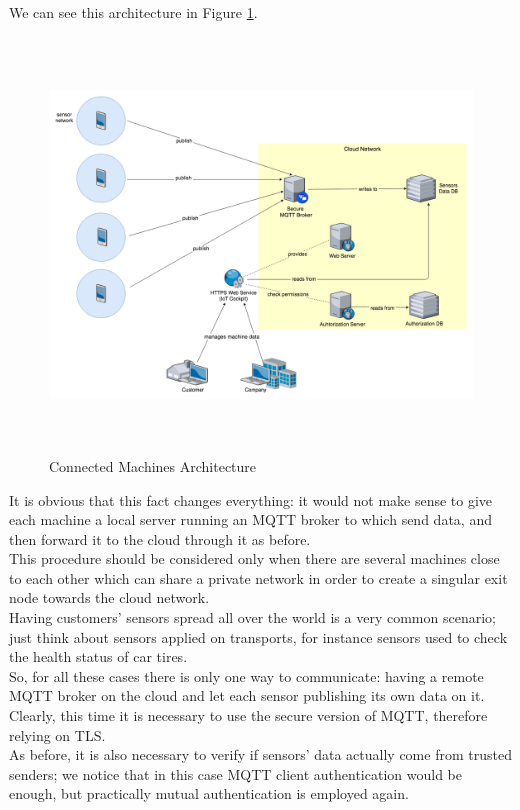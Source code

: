 \documentclass[12pt]{report}
\begin{document}
{We can see this architecture in Figure \ref{fig:connectedmachines}.

\begin{figure}[H]
\includegraphics[width=14cm,height=11cm,keepaspectratio]{connectedmachines_architecture}
\centering
\caption{Connected Machines Architecture}
\label{fig:connectedmachines}
\end{figure}

It is obvious that this fact changes everything: it would not make sense to give each machine a local server running an MQTT broker to which send data, and then forward it to the cloud through it as before.\\
This procedure should be considered only when there are several machines close to each other which can share a private network in order to create a singular exit node towards the cloud network.\\

Having customers' sensors spread all over the world is a very common scenario; just think about sensors applied on transports, for instance sensors used to check the health status of car tires.\\

So, for all these cases there is only one way to communicate: having a remote MQTT broker on the cloud and let each sensor publishing its own data on it.\\
Clearly, this time it is necessary to use the secure version of MQTT, therefore relying on TLS.\\
As before, it is also necessary to verify if sensors' data actually come from trusted senders; we notice that in this case MQTT client authentication would be enough, but practically mutual authentication is employed again.\\

}
\end{document}
